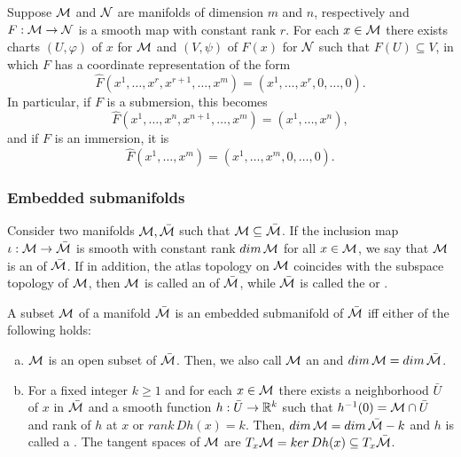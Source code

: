\documentclass[11pt,a4paper]{article}
\begin{document}
\begin{proposition}
Suppose $\mathcal{M}$ and $\mathcal{N}$ are manifolds of dimension $m$ and $n$, respectively and $F:\mathcal{M}\rightarrow \mathcal{N}$ is a smooth map with constant rank $r$. For each $x\in \mathcal{M}$ there exists charts $(U,\varphi)$ of $x$ for $\mathcal{M}$ and $(V,\psi)$ of $F(x)$ for $\mathcal{N}$ such that $F(U)\subseteq V$, in which $F$ has a coordinate representation of the form
\begin{equation*}
\hat{F}(x^1,\ldots,x^r,x^{r+1},\ldots,x^m) = (x^1,\ldots,x^r,0,\ldots,0).
\end{equation*}
In particular, if $F$ is a submersion, this becomes
\begin{equation*}
\hat{F}(x^1,\ldots,x^n,x^{n+1},\ldots,x^m) = (x^1,\ldots,x^n),
\end{equation*}
and if $F$ is an immersion, it is
\begin{equation*}
\hat{F}(x^1,\ldots,x^m) = (x^1,\ldots,x^m,0,\ldots, 0).
\end{equation*}
\end{proposition}

\subsubsection{Embedded submanifolds}

\begin{definition}
Consider two manifolds $\mathcal{M},\bar{\mathcal{M}}$ such that $\mathcal{M}\subseteq \bar{\mathcal{M}}$. If the inclusion map $\iota:\mathcal{M}\rightarrow \bar{\mathcal{M}}$ is smooth with constant rank $dim\,\mathcal{M}$ for all $x\in \mathcal{M}$, we say that $\mathcal{M}$ is an  of $\bar{\mathcal{M}}$. If in addition, the atlas topology on $\mathcal{M}$ coincides with the subspace topology of $\mathcal{M}$, then $\mathcal{M}$ is called an  of $\bar{\mathcal{M}}$, while $\bar{\mathcal{M}}$ is called the  or .
\end{definition}

\begin{proposition}
A subset $\mathcal{M}$ of a manifold $\bar{\mathcal{M}}$ is an embedded submanifold of $\bar{\mathcal{M}}$ iff either of the following holds:
\begin{enumerate}[(a)]
    \item $\mathcal{M}$ is an open subset of $\bar{\mathcal{M}}$. Then, we also call $\mathcal{M}$ an  and $dim\,\mathcal{M} = dim\,\bar{\mathcal{M}}$.
    \item For a fixed integer $k\ge 1$ and for each $x\in \mathcal{M}$ there exists a neighborhood $\bar{U}$ of $x$ in $\bar{\mathcal{M}}$ and a smooth function $h:\bar{U}\rightarrow \mathbb{R}^k$ such that $h^{-1}(0) = \mathcal{M}\cap \bar{U}$ and rank of $h$ at $x$ or $rank\,Dh(x) = k$. Then, $dim\,\mathcal{M} = dim\,\bar{\mathcal{M}} - k$ and $h$ is called a . The tangent spaces of $\mathcal{M}$ are $T_x\mathcal{M} = ker\,Dh(x)\subseteq T_x\bar{\mathcal{M}}$.
\end{enumerate}
\end{proposition}
\end{document}
